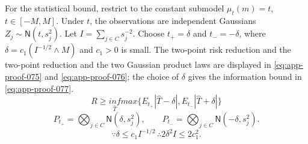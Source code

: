 \documentclass[11pt]{article}
\numberwithin{equation}{section}
\newcommand{\1}{\mathbf 1}
\newcommand{\abs}[1]{\left\lvert #1\right\rvert}
\newcommand{\Normal}{\mathsf N}
\begin{document}
For the statistical bound, restrict to the constant submodel
\(\mu_t(m)=t\), \(t\in[-M,M]\).  Under \(t\), the observations are
independent Gaussians \(Z_j\sim\Normal(t,s_j^2)\).  Let
\(I=\sum_{j\in C}s_j^{-2}\).  Choose \(t_+=\delta\) and \(t_-=-\delta\),
where \(\delta=c_1(I^{-1/2}\wedge M)\) and \(c_1>0\) is small.  The
two-point risk reduction and the two-point reduction and the two Gaussian product laws are displayed in \eqref{eq:app-proof-075} and \eqref{eq:app-proof-076}; the choice of
\(\delta\) gives the information bound in \eqref{eq:app-proof-077}.
\begin{equation}
\label{eq:app-proof-075}
R\ge \underset{\widehat T}{inf}max\{E_{t_+}\abs{\widehat T-\delta},E_{t_-}\abs{\widehat T+\delta}\}
\end{equation}
 \begin{equation}
\label{eq:app-proof-076}
P_{t_+}
=\bigotimes_{j\in C}\Normal(\delta,s_j^2),
\qquad
P_{t_-}
=\bigotimes_{j\in C}\Normal(-\delta,s_j^2).
\end{equation}
 \begin{equation}
\label{eq:app-proof-077}
\because\delta\le c_1I^{-1/2}\,\therefore 2\delta^2I\le2c_1^2.
\end{equation}
\end{document}
